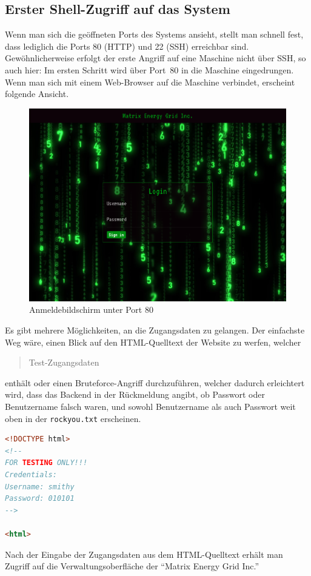 \subsection{Erster Shell-Zugriff auf das System}
Wenn man sich die geöffneten Ports des Systems ansieht, stellt man schnell fest, dass lediglich die Ports 80 (HTTP) und 22 (SSH) erreichbar sind.
Gewöhnlicherweise erfolgt der erste Angriff auf eine Maschine nicht über SSH, so auch hier:
Im ersten Schritt wird über Port~80 in die Maschine eingedrungen.
Wenn man sich mit einem Web-Browser auf die Maschine verbindet, erscheint folgende Ansicht.


\begin{figure}[!ht]
    \centering
    \includegraphics[width=.7\textwidth]{img/login.png}
    \caption{Anmeldebildschirm unter Port 80}
\end{figure}

Es gibt mehrere Möglichkeiten, an die Zugangsdaten zu gelangen. Der einfachste Weg wäre, einen Blick auf den HTML-Quelltext der Website zu werfen, welcher \blockquote{Test-Zugangsdaten} enthält oder einen Bruteforce-Angriff durchzuführen, welcher dadurch erleichtert wird, dass das Backend in der Rückmeldung angibt, ob Passwort oder Benutzername falsch waren, und sowohl Benutzername als auch Passwort weit oben in der \texttt{rockyou.txt} erscheinen.

\begin{lstlisting}[language=HTML]
<!DOCTYPE html>
<!--
FOR TESTING ONLY!!!
Credentials:
Username: smithy
Password: 010101
-->

<html>
\end{lstlisting}

Nach der Eingabe der Zugangsdaten aus dem HTML-Quelltext erhält man Zugriff auf die Verwaltungsoberfläche der \enquote{Matrix Energy Grid Inc.}



